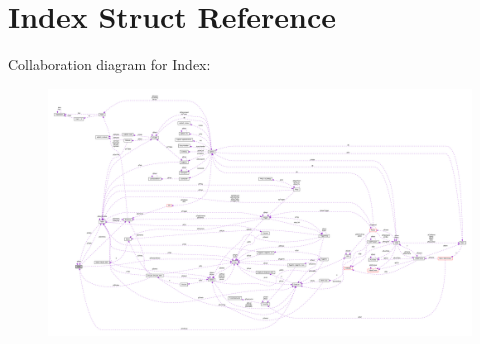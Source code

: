\hypertarget{structIndex}{}\section{Index Struct Reference}
\label{structIndex}


Collaboration diagram for Index\+:\nopagebreak
\begin{figure}[H]
\begin{center}
\leavevmode
\includegraphics[width=350pt]{structIndex__coll__graph}
\end{center}
\end{figure}
